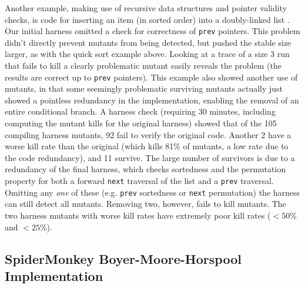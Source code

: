 \documentclass[conference]{IEEEtran}
\begin{document}
Another example, making use of recursive data structures and pointer
validity checks, is code for inserting an item (in
sorted order) into a doubly-linked list \cite{DLLInsert}.  Our initial
harness omitted a check for correctness of {\tt prev} pointers.  This
problem didn't directly prevent mutants from being detected, but
pushed the stable size larger, as with the quick sort example above.
Looking at a trace of a size 3 run that fails to kill a clearly
problematic mutant easily reveals the problem (the results are correct
up to {\tt prev} pointers).  This example also showed another use of
mutants, in that some seemingly problematic surviving mutants actually
just showed a pointless redundancy in the implementation, enabling the
removal of an entire conditional branch.  A harness check (requiring
30 minutes, including computing the mutant kills for the original
harness) showed that of the 105 compiling harness mutants, 92 fail to
verify the original code.  Another 2 have a worse kill rate than the
original (which kills 81\% of mutants, a low rate due to the code
redundancy), and 11 survive.  The large number of survivors is due to
a redundancy of the final harness, which checks sortedness and the
permutation property for both a forward {\tt next} traversal of the
list and a {\tt prev} traversal.  Omitting any \emph{one} of these
(e.g. {\tt prev} sortedness or {\tt next} permutation) the harness can
still detect all mutants.  Removing two, however, fails to kill
mutants.  The two harness mutants with worse kill rates have extremely poor
kill rates ($<50$\% and $<25$\%).



\subsection{SpiderMonkey Boyer-Moore-Horspool Implementation}
\end{document}
